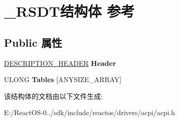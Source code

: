 \hypertarget{struct___r_s_d_t}{}\section{\+\_\+\+R\+S\+D\+T结构体 参考}
\label{struct___r_s_d_t}
\subsection*{Public 属性}
\begin{DoxyCompactItemize}
\item 
\mbox{\label{struct___r_s_d_t_ae5cd3e6ba8afedb094325e1b528454ff}} 
\hyperlink{struct___d_e_s_c_r_i_p_t_i_o_n___h_e_a_d_e_r}{D\+E\+S\+C\+R\+I\+P\+T\+I\+O\+N\+\_\+\+H\+E\+A\+D\+ER} {\bfseries Header}
\item 
\mbox{\label{struct___r_s_d_t_a5140278e76e5dc99717f8530575bc825}} 
U\+L\+O\+NG {\bfseries Tables} \mbox{[}A\+N\+Y\+S\+I\+Z\+E\+\_\+\+A\+R\+R\+AY\mbox{]}
\end{DoxyCompactItemize}


该结构体的文档由以下文件生成\+:\begin{DoxyCompactItemize}
\item 
E\+:/\+React\+O\+S-\/0../sdk/include/reactos/drivers/acpi/acpi.\+h\end{DoxyCompactItemize}
